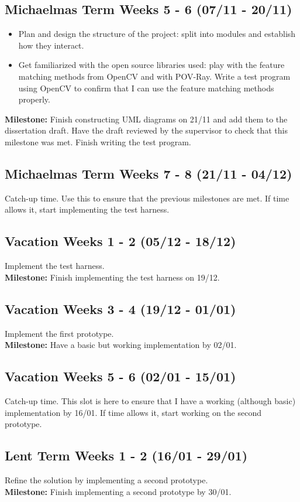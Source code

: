 \subsection*{Michaelmas Term Weeks 5 - 6 (07/11 - 20/11)}
\begin{itemize}
\item Plan and design the structure of the project: split into modules and establish how they interact.
\item Get familiarized with the open source libraries used: play with the feature matching methods from OpenCV and with POV-Ray. Write a test program using OpenCV to confirm that I can use the feature matching methods properly.
\end{itemize}
{\bf Milestone:} Finish constructing UML diagrams on 21/11 and add them to the dissertation draft. Have the draft reviewed by the supervisor to check that this milestone was met. Finish writing the test program.

\subsection*{Michaelmas Term Weeks 7 - 8 (21/11 - 04/12)}
Catch-up time. Use this to ensure that the previous milestones are met. If time allows it, start implementing the test harness.
	
\subsection*{Vacation Weeks 1 - 2 (05/12 - 18/12)}
Implement the test harness.\\
{\bf Milestone:} Finish implementing the test harness on 19/12.

\subsection*{Vacation Weeks 3 - 4 (19/12 - 01/01)}
Implement the first prototype.\\
{\bf Milestone:} Have a basic but working implementation by 02/01.
	
\subsection*{Vacation Weeks 5 - 6 (02/01 - 15/01)}
Catch-up time. This slot is here to ensure that I have a working (although basic) implementation by 16/01. If time allows it, start working on the second prototype.

\subsection*{Lent Term Weeks 1 - 2 (16/01 - 29/01)}
Refine the solution by implementing a second prototype.\\
{\bf Milestone:} Finish implementing a second prototype by 30/01.

